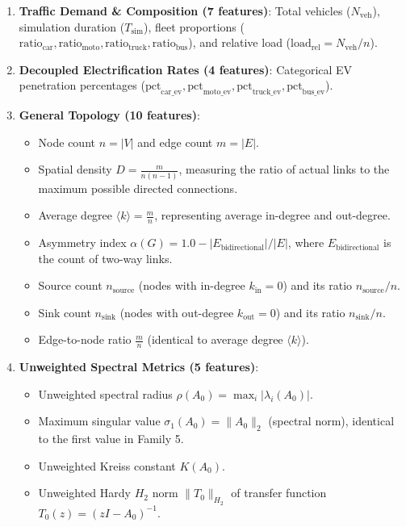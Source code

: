 \documentclass[lettersize,journal]{IEEEtran}
\begin{document}
\begin{enumerate}
    \item \textbf{Traffic Demand \& Composition (7 features)}: Total vehicles ($N_{\text{veh}}$), simulation duration ($T_{\text{sim}}$), fleet proportions ($\text{ratio}_{\text{car}}, \text{ratio}_{\text{moto}}, \text{ratio}_{\text{truck}}, \text{ratio}_{\text{bus}}$), and relative load ($\text{load}_{\text{rel}} = N_{\text{veh}} / n$).
    \item \textbf{Decoupled Electrification Rates (4 features)}: Categorical EV penetration percentages ($\text{pct}_{\text{car\_ev}}, \text{pct}_{\text{moto\_ev}}, \text{pct}_{\text{truck\_ev}}, \text{pct}_{\text{bus\_ev}}$).
    \item \textbf{General Topology (10 features)}: 
    \begin{itemize}
        \item Node count $n = |V|$ and edge count $m = |E|$.
        \item Spatial density $D = \frac{m}{n(n-1)}$, measuring the ratio of actual links to the maximum possible directed connections.
        \item Average degree $\langle k \rangle = \frac{m}{n}$, representing average in-degree and out-degree.
        \item Asymmetry index $\alpha(G) = 1.0 - |E_{\text{bidirectional}}|/|E|$, where $E_{\text{bidirectional}}$ is the count of two-way links.
        \item Source count $n_{\text{source}}$ (nodes with in-degree $k_{\text{in}} = 0$) and its ratio $n_{\text{source}}/n$.
        \item Sink count $n_{\text{sink}}$ (nodes with out-degree $k_{\text{out}} = 0$) and its ratio $n_{\text{sink}}/n$.
        \item Edge-to-node ratio $\frac{m}{n}$ (identical to average degree $\langle k \rangle$).
    \end{itemize}
    \item \textbf{Unweighted Spectral Metrics (5 features)}:
    \begin{itemize}
        \item Unweighted spectral radius $\rho(A_0) = \max_i |\lambda_i(A_0)|$.
        \item Maximum singular value $\sigma_1(A_0) = \|A_0\|_2$ (spectral norm), identical to the first value in Family 5.
        \item Unweighted Kreiss constant $K(A_0)$.
        \item Unweighted Hardy $H_2$ norm $\|T_0\|_{H_2}$ of transfer function $T_0(z) = (zI - A_0)^{-1}$.

\end{itemize}
\end{enumerate}
\end{document}
